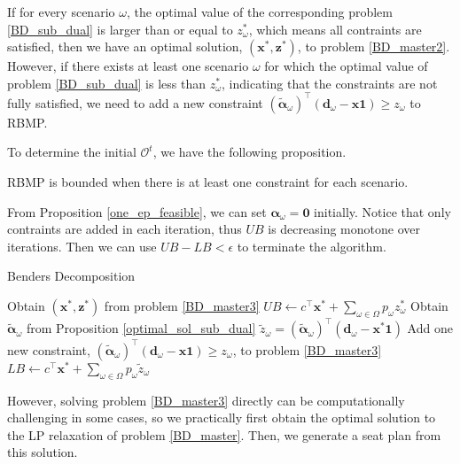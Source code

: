 If for every scenario $\omega$, the optimal value of the corresponding problem \eqref{BD_sub_dual} is larger than or equal to $z_{\omega}^{*}$, which means all contraints are satisfied, then we have an optimal solution, $(\mathbf{x}^{*}, \mathbf{z}^{*})$, to problem \eqref{BD_master2}. However, if there exists at least one scenario $\omega$ for which the optimal value of problem \eqref{BD_sub_dual} is less than $z_{\omega}^{*}$, indicating that the constraints are not fully satisfied, we need to add a new constraint $(\bm{\tilde{\alpha}}_{\omega})^{\intercal}(\mathbf{d}_{\omega} - \mathbf{x} \mathbf{1}) \geq z_{\omega}$ to RBMP.


To determine the initial $\mathcal{O}^{t}$, we have the following proposition.

\begin{prop}\label{one_ep_feasible}
RBMP is bounded when there is at least one constraint for each scenario.
\end{prop}

From Proposition \ref{one_ep_feasible}, we can set $\bm{\alpha}_{\omega} = \mathbf{0}$ initially. Notice that only contraints are added in each iteration, thus $UB$ is decreasing monotone over iterations. Then we can use $UB - LB < \epsilon$ to terminate the algorithm.

\begin{algorithm}[h]
  \caption{Benders Decomposition}\label{cut_algo}
    {Obtain $(\mathbf{x}^{*}, \mathbf{z}^{*})$ from problem \eqref{BD_master3}\;
    $UB \gets c^{\intercal} \mathbf{x}^{*} + \sum_{\omega \in \Omega} p_{\omega} z_{\omega}^{*}$\;
    {Obtain $\bm{\tilde{\alpha}}_{\omega}$ from Proposition \ref{optimal_sol_sub_dual}\; $\tilde{z}_{\omega}= (\bm{\tilde{\alpha}}_{\omega})^{\intercal}(\mathbf{d}_{\omega}- \mathbf{x}^{*} \mathbf{1})$\;
    {Add one new constraint, $(\bm{\tilde{\alpha}}_{\omega})^{\intercal}(\mathbf{d}_{\omega}- \mathbf{x} \mathbf{1}) \geq z_{\omega}$, to problem \eqref{BD_master3}\;}
    }
    {$LB \gets c^{\intercal} \mathbf{x}^{*} + \sum_{\omega \in \Omega} p_{\omega} \tilde{z}_{\omega} $\;}
    }
\end{algorithm}

However, solving problem \eqref{BD_master3} directly can be computationally challenging in some cases, so we practically first obtain the optimal solution to the LP relaxation of problem \eqref{BD_master}. Then, we generate a seat plan from this solution.


